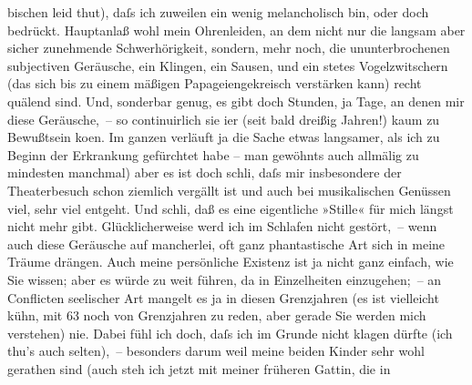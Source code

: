 \begin{ledgroupsized}[t]{13cm}
               bischen leid thut), daſs ich {\pb}zuweilen ein wenig
               melancholisch bin, oder doch bedrückt. Hauptanlaß wohl mein Ohrenleiden, an dem nicht
               nur die langsam aber sicher zunehmende Schwerhörigkeit, sondern, mehr noch, die
               ununterbrochenen subjectiven Geräusche, ein Klingen, ein Sausen, und ein \strikeout{\textcolor{gray}{nicht}} stetes Vogelzwitschern (das sich bis zu einem mäßigen Papageiengekreisch
               verstärken kann) recht quälend sind. Und, sonderbar genug, es gibt doch Stunden, ja
               Tage, an denen mir diese Geräusche, – so continuirlich sie i{\geminationm}er (seit bald dreißig Jahren!) kaum zu Bewußtsein ko{\geminationm}en. Im ganzen verläuft ja die Sache etwas langsamer,
               als ich zu Beginn der Erkrankung gefürchtet habe – man gewöhnts auch allmälig \label{T_L02444_1v}\label{T_L02444_1h}zu mindesten manchmal) aber es ist doch schli{\geminationm}, daſs mir insbesondere der Theaterbesuch schon
               ziemlich vergällt ist und auch bei musikalischen Genüssen viel, sehr viel entgeht.
               Und schli{\geminationm}, {\pb}daß es
               eine eigentliche »Stille« für mich längst nicht mehr gibt. Glücklicherweise werd ich
               im Schlafen nicht gestört, – wenn auch diese Geräusche auf mancherlei, oft ganz
               phantastische Art sich in meine Träume drängen.\pend
           \pstart
           Auch meine persönliche Existenz ist ja nicht ganz einfach, wie Sie wissen; aber es
               würde zu weit führen, da in Einzelheiten einzugehen; – an Conflicten seelischer Art
               mangelt es ja in diesen Grenzjahren (es ist vielleicht kühn, mit 63 noch von
               Grenzjahren zu reden, aber gerade Sie werden mich verstehen) nie.\pend
           \pstart
           Dabei fühl ich doch, daſs ich im Grunde nicht klagen dürfte (ich thu’s auch
               selten), – besonders darum weil meine beiden Kinder sehr wohl gerathen sind (auch steh ich jetzt mit
               meiner früheren Gattin, die in

\end{ledgroupsized}
